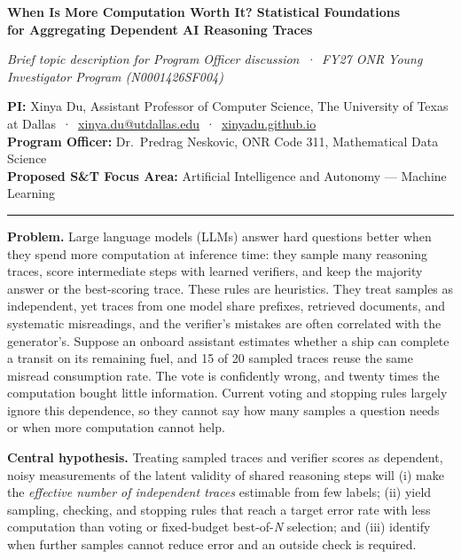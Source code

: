 \documentclass[11pt]{article}
\newcommand{\head}[1]{{\color{navy}\textbf{#1}}\enspace}
\newcommand{\POline}{Dr.\ Predrag Neskovic, ONR Code 311, Mathematical Data Science}
\newcommand{\FocusArea}{Artificial Intelligence and Autonomy --- Machine Learning}
\begin{document}
\begin{center}
{\fontsize{15.5}{18.5}\selectfont\bfseries\color{navy} When Is More Computation Worth It? Statistical Foundations\\[1pt] for Aggregating Dependent AI Reasoning Traces\par}
\vspace{3pt}
{\small\itshape Brief topic description for Program Officer discussion \,·\, FY27 ONR Young Investigator Program (N0001426SF004)\par}
\end{center}
\vspace{-2pt}
{\small
\textbf{PI:} Xinya Du, Assistant Professor of Computer Science, The University of Texas at Dallas \,·\, \href{mailto:xinya.du@utdallas.edu}{xinya.du@utdallas.edu} \,·\, \href{https://xinyadu.github.io}{xinyadu.github.io}\\
\textbf{Program Officer:} \POline\\
\textbf{Proposed S\&T Focus Area:} \FocusArea\par}
\vspace{-3pt}
{\color{navy}\rule{\linewidth}{0.6pt}}

\head{Problem.} Large language models (LLMs) answer hard questions better when they spend more computation at inference time: they sample many reasoning traces, score intermediate steps with learned verifiers, and keep the majority answer or the best-scoring trace. These rules are heuristics. They treat samples as independent, yet traces from one model share prefixes, retrieved documents, and systematic misreadings, and the verifier's mistakes are often correlated with the generator's. Suppose an onboard assistant estimates whether a ship can complete a transit on its remaining fuel, and 15 of 20 sampled traces reuse the same misread consumption rate. The vote is confidently wrong, and twenty times the computation bought little information. Current voting and stopping rules largely ignore this dependence, so they cannot say how many samples a question needs or when more computation cannot help.

\head{Central hypothesis.} Treating sampled traces and verifier scores as dependent, noisy measurements of the latent validity of shared reasoning steps will (i) make the \emph{effective number of independent traces} estimable from few labels; (ii) yield sampling, checking, and stopping rules that reach a target error rate with less computation than voting or fixed-budget best-of-\textit{N} selection; and (iii) identify when further samples cannot reduce error and an outside check is required.
\end{document}

